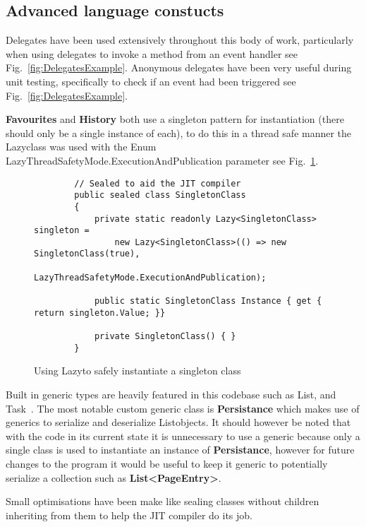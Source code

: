\documentclass[../Main.tex]{subfiles}
\begin{document}
\subsection{Advanced language constucts}

Delegates have been used extensively throughout this body of work, particularly when using delegates to invoke a method from an event handler see Fig.~\ref{fig:DelegatesExample}. Anonymous delegates have been very useful during unit testing, specifically to check if an event had been triggered see Fig.~\ref{fig:DelegatesExample}.~\autocite{billwagnerDelegatesProgrammingGuide}

\textbf{Favourites} and \textbf{History} both use a singleton pattern for instantiation (there should only be a single instance of each), to do this in a thread safe manner the Lazy\genT class was used with the Enum LazyThreadSafetyMode.ExecutionAndPublication parameter see Fig.~\ref{fig:LazySingletonExample}.~\autocite{dotnet-botLazyClassSystem,dotnet-botLazyThreadSafetyModeEnumSystem}

\begin{figure}[h]
    \begin{verbatim}
        // Sealed to aid the JIT compiler
        public sealed class SingletonClass
        {
            private static readonly Lazy<SingletonClass> singleton = 
                new Lazy<SingletonClass>(() => new SingletonClass(true),
                LazyThreadSafetyMode.ExecutionAndPublication);

            public static SingletonClass Instance { get { return singleton.Value; }}

            private SingletonClass() { }
        }

    \end{verbatim}
    \caption{Using Lazy\genT to safely instantiate a singleton class}
    \label{fig:LazySingletonExample}
\end{figure}


Built in generic types are heavily featured in this codebase such as List\genT, and Task\genT~\autocite{dotnet-botTaskClassSystema}. The most notable custom generic class is \textbf{Persistance\genT} which makes use of generics to serialize and deserialize List\genT objects. It should however be noted that with the code in its current state it is unnecessary to use a generic because only a single class is used to instantiate an instance of \textbf{Persistance\genT}, however for future changes to the program it would be useful to keep it generic to potentially serialize a collection such as \textbf{List\textless\ignorespaces PageEntry\textgreater}.

Small optimisations have been make like sealing classes without children inheriting from them to help the JIT compiler do its job.~\autocite{billwagnerSealedModifierReference}
\end{document}
